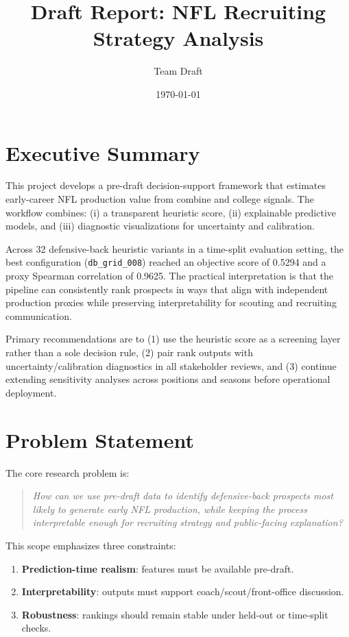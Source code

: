 \documentclass[10pt]{article}
\title{Draft Report: NFL Recruiting Strategy Analysis}
\author{Team Draft}
\date{\today}
\begin{document}
\maketitle

\section{Executive Summary}
This project develops a pre-draft decision-support framework that estimates early-career NFL production value from combine and college signals. The workflow combines: (i) a transparent heuristic score, (ii) explainable predictive models, and (iii) diagnostic visualizations for uncertainty and calibration.

Across 32 defensive-back heuristic variants in a time-split evaluation setting, the best configuration (\texttt{db\_grid\_008}) reached an objective score of 0.5294 and a proxy Spearman correlation of 0.9625. The practical interpretation is that the pipeline can consistently rank prospects in ways that align with independent production proxies while preserving interpretability for scouting and recruiting communication.

Primary recommendations are to (1) use the heuristic score as a screening layer rather than a sole decision rule, (2) pair rank outputs with uncertainty/calibration diagnostics in all stakeholder reviews, and (3) continue extending sensitivity analyses across positions and seasons before operational deployment.

\section{Problem Statement}
The core research problem is:
\begin{quote}
\emph{How can we use pre-draft data to identify defensive-back prospects most likely to generate early NFL production, while keeping the process interpretable enough for recruiting strategy and public-facing explanation?}
\end{quote}

This scope emphasizes three constraints:
\begin{enumerate}
  \item \textbf{Prediction-time realism}: features must be available pre-draft.
  \item \textbf{Interpretability}: outputs must support coach/scout/front-office discussion.
  \item \textbf{Robustness}: rankings should remain stable under held-out or time-split checks.
\end{enumerate}
\end{document}
